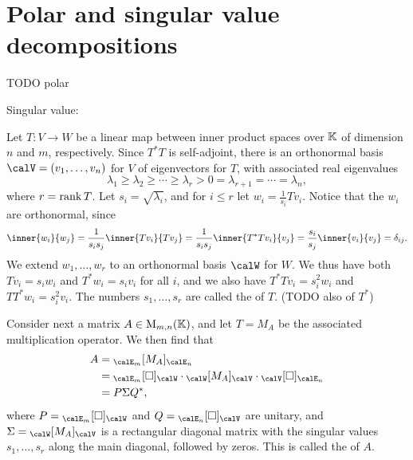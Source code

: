 \section{Polar and singular value decompositions}

TODO polar

Singular value:

Let $T \colon V \to W$ be a linear map between inner product spaces over $\mathbb{K}$ of dimension $n$ and $m$, respectively. Since $T^*T$ is self-adjoint, there is an orthonormal basis $\calV = (v_1,\ldots,v_n)$ for $V$ of eigenvectors for $T$, with associated real eigenvalues
%
\begin{equation*}
    \lambda_1
        \geq \lambda_2
        \geq \cdots
        \geq \lambda_r
        > 0
        = \lambda_{r+1}
        = \cdots
        = \lambda_n,
\end{equation*}
%
where $r = \operatorname{rank} T$. Let $s_i = \sqrt{\lambda_i}$, and for $i \leq r$ let $w_i = \tfrac{1}{s_i}Tv_i$. Notice that the $w_i$ are orthonormal, since
%
\begin{equation*}
    \inner{w_i}{w_j}
        = \frac{1}{s_i s_j} \inner{Tv_i}{Tv_j}
        = \frac{1}{s_i s_j} \inner{T^*Tv_i}{v_j}
        = \frac{s_i}{s_j} \inner{v_i}{v_j}
        = \delta_{ij}.
\end{equation*}
%
We extend $w_1,\ldots,w_r$ to an orthonormal basis $\calW$ for $W$. We thus have both $Tv_i = s_i w_i$ and $T^*w_i = s_i v_i$ for all $i$, and we also have $T^*Tv_i = s_i^2 w_i$ and $TT^*w_i = s_i^2 v_i$. The numbers $s_1, \ldots, s_r$ are called the  of $T$. (TODO also of $T^*$)

Consider next a matrix $A \in \mathrm{M}_{m,n}(\mathbb{K})$, and let $T = M_A$ be the associated multiplication operator. We then find that
%
\begin{align*}
    A
        &= \mr{\calE_m}{M_A}{\calE_n} \\
        &= \basischangemat{\calE_m}{\calW} \cdot \mr{\calW}{M_A}{\calV} \cdot \basischangemat{\calV}{\calE_n} \\
        &= P \Sigma Q^*,
\end{align*}
%
where $P = \basischangemat{\calE_m}{\calW}$ and $Q = \basischangemat{\calE_n}{\calV}$ are unitary, and $\Sigma = \mr{\calW}{M_A}{\calV}$ is a rectangular diagonal matrix with the singular values $s_1, \ldots, s_r$ along the main diagonal, followed by zeros. This is called the  of $A$.